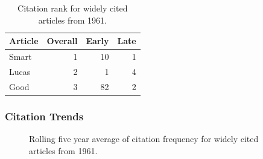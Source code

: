 \documentclass[
  10pt,
  letterpaper,
  DIV=11,
  numbers=noendperiod,
  twoside]{scrartcl}
\begin{document}
\begin{longtable}[]{@{}lrrr@{}}

\caption{\label{tbl-citation-rank-1961}Citation rank for widely cited
articles from 1961.}

\tabularnewline

\toprule\noalign{}
Article & Overall & Early & Late \\
\midrule\noalign{}
\endhead
\bottomrule\noalign{}
\endlastfoot
Smart & 1 & 10 & 1 \\
Lucas & 2 & 1 & 4 \\
Good & 3 & 82 & 2 \\

\end{longtable}

\subsubsection*{Citation Trends}\label{sec-trends-1961}

\begin{figure}


\caption{\label{fig-citation-spaghetti-1961}Rolling five year average of
citation frequency for widely cited articles from 1961.}

\end{figure}%
\end{document}
